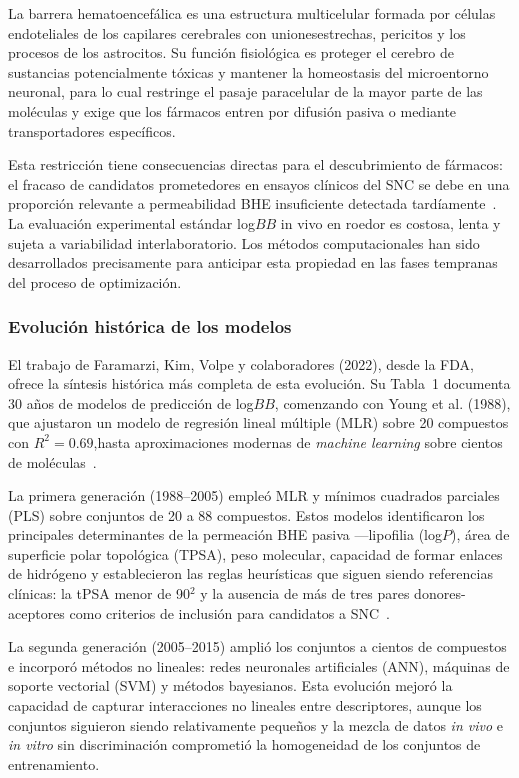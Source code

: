 La barrera hematoencefálica es una estructura multicelular formada por células endoteliales de los capilares cerebrales con unionesestrechas, pericitos y los procesos de los astrocitos. Su función fisiológica es proteger el cerebro de sustancias potencialmente tóxicas y mantener la homeostasis del microentorno neuronal, para lo cual restringe el pasaje
paracelular de la mayor parte de las moléculas y exige que los fármacos entren por difusión pasiva o mediante transportadores específicos.
 
Esta restricción tiene consecuencias directas para el descubrimiento de fármacos: el fracaso de candidatos prometedores en ensayos clínicos del SNC se debe en una proporción relevante a permeabilidad BHE insuficiente detectada tardíamente~\cite{spielvogel_enhancing_2025a}. La evaluación experimental estándar log$BB$ in vivo en roedor es costosa, lenta y sujeta a variabilidad interlaboratorio. Los métodos computacionales han sido desarrollados precisamente para anticipar esta propiedad en las fases tempranas del proceso de optimización.
 
\subsubsection{Evolución histórica de los modelos}
 
El trabajo de Faramarzi, Kim, Volpe y colaboradores (2022), desde la FDA, ofrece la síntesis histórica más completa de esta evolución. Su Tabla~1 documenta 30 años de modelos de predicción de log$BB$, comenzando con Young et al. (1988), que ajustaron un modelo de regresión lineal múltiple (MLR) sobre 20 compuestos con $R^2 = 0.69$,hasta aproximaciones modernas de \textit{machine learning} sobre cientos de moléculas~\cite{faramarzi_development_2022}.
 
La primera generación (1988–2005) empleó MLR y mínimos cuadrados parciales (PLS) sobre conjuntos de 20 a 88 compuestos. Estos modelos identificaron los principales determinantes de la permeación BHE pasiva —lipofilia (log$P$), área de superficie polar topológica (TPSA), peso molecular, capacidad de formar enlaces de hidrógeno y establecieron las reglas heurísticas que siguen siendo referencias clínicas: la tPSA menor de 90$^2$ y la ausencia de más de tres pares donores-aceptores como criterios de inclusión para candidatos a SNC~\cite{spielvogel_enhancing_2025a}.
 
La segunda generación (2005–2015) amplió los conjuntos a cientos de compuestos e incorporó métodos no lineales: redes neuronales artificiales (ANN), máquinas de soporte vectorial (SVM) y métodos bayesianos. Esta evolución mejoró la capacidad de capturar interacciones no lineales entre descriptores, aunque los conjuntos siguieron siendo relativamente pequeños y la mezcla de datos \textit{in vivo} e \textit{in vitro} sin discriminación comprometió la homogeneidad de los conjuntos de entrenamiento.
 

